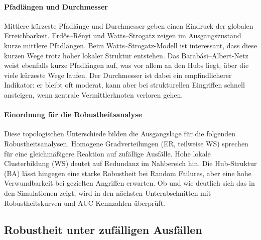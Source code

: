 \documentclass[12pt,a4paper]{article}
\begin{document}
\paragraph{Pfadlängen und Durchmesser}
Mittlere kürzeste Pfadlänge und Durchmesser geben einen Eindruck der globalen
Erreichbarkeit. Erdős--Rényi und Watts--Strogatz zeigen im Ausgangszustand kurze
mittlere Pfadlängen. Beim Watts--Strogatz-Modell ist interessant, dass diese
kurzen Wege trotz hoher lokaler Struktur entstehen. Das Barabási--Albert-Netz
weist ebenfalls kurze Pfadlängen auf, was vor allem an den Hubs liegt, über die
viele kürzeste Wege laufen. Der Durchmesser ist dabei ein empfindlicherer
Indikator: er bleibt oft moderat, kann aber bei strukturellen Eingriffen schnell
ansteigen, wenn zentrale Vermittlerknoten verloren gehen.

\paragraph{Einordnung für die Robustheitsanalyse}
Diese topologischen Unterschiede bilden die Ausgangslage für die folgenden
Robustheitsanalysen. Homogene Gradverteilungen (ER, teilweise WS) sprechen für
eine gleichmäßigere Reaktion auf zufällige Ausfälle. Hohe lokale Clusterbildung
(WS) deutet auf Redundanz im Nahbereich hin. Die Hub-Struktur (BA) lässt
hingegen eine starke Robustheit bei Random Failures, aber eine hohe
Verwundbarkeit bei gezielten Angriffen erwarten. Ob und wie deutlich sich das
in den Simulationen zeigt, wird in den nächsten Unterabschnitten mit
Robustheitskurven und AUC-Kennzahlen überprüft.

\subsection{Robustheit unter zufälligen Ausfällen}
\end{document}
